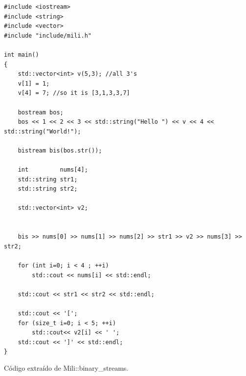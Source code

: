 \begin{table}[!ht]
    \lstset{language=C++}
    \begin{lstlisting}[frame=single]
#include <iostream>
#include <string>
#include <vector>
#include "include/mili.h"

int main()
{
    std::vector<int> v(5,3); //all 3's
    v[1] = 1;
    v[4] = 7; //so it is [3,1,3,3,7]

    bostream bos;
    bos << 1 << 2 << 3 << std::string("Hello ") << v << 4 << std::string("World!");

    bistream bis(bos.str());

    int         nums[4];
    std::string str1;
    std::string str2;

    std::vector<int> v2;


    bis >> nums[0] >> nums[1] >> nums[2] >> str1 >> v2 >> nums[3] >> str2;

    for (int i=0; i < 4 ; ++i)
        std::cout << nums[i] << std::endl;

    std::cout << str1 << str2 << std::endl;

    std::cout << '[';
    for (size_t i=0; i < 5; ++i)
        std::cout<< v2[i] << ' ';
    std::cout << ']' << std::endl;
}
    \end{lstlisting}
    \centering \caption{C\'odigo extra\'ido de Mili::binary\_streams.}
    \label{bstreamuse}
\end{table}

